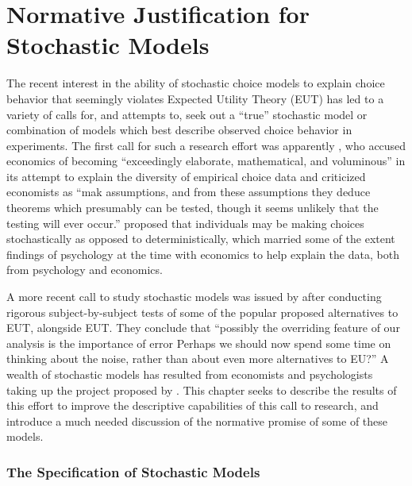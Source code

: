
\onehalfspacing
\chapter{Normative Justification for Stochastic Models}


The recent interest in the ability of stochastic choice models to explain choice behavior that seemingly violates Expected Utility Theory (EUT) has led to a variety of calls for, and attempts to, seek out a \enquote{true} stochastic model or combination of  models which best describe observed choice behavior in experiments.
The first call for such a research effort was apparently \textcite{Edwards1954}, who accused economics of becoming \enquote{exceedingly elaborate, mathematical, and voluminous} \textcite[380]{Edwards1954} in its attempt to explain the diversity of empirical choice data and criticized economists as \enquote{mak assumptions, and from these assumptions they deduce theorems which presumably can be tested, though it seems unlikely that the testing will ever occur.}
\textcite{Edwards1954} proposed that individuals may be making choices stochastically as opposed to deterministically, which married some of the extent findings of psychology at the time with economics to help explain the data, both from psychology and economics.

A more recent call to study stochastic models was issued by \textcite[1321]{Hey1994} after conducting rigorous subject-by-subject tests of some of the popular proposed alternatives to EUT, alongside EUT.
They conclude that \enquote{possibly the overriding feature of our analysis is the importance of error \textelp{} Perhaps we should now spend some time on thinking about the noise, rather than about even more alternatives to EU?}
A wealth of stochastic models has resulted from economists and psychologists taking up the project proposed by \textcite{Hey1994}.
This chapter seeks to describe the results of this effort to improve the descriptive capabilities of this call to research, and introduce a much needed discussion of the normative promise of some of these models.


\subsection{The Specification of Stochastic Models}

